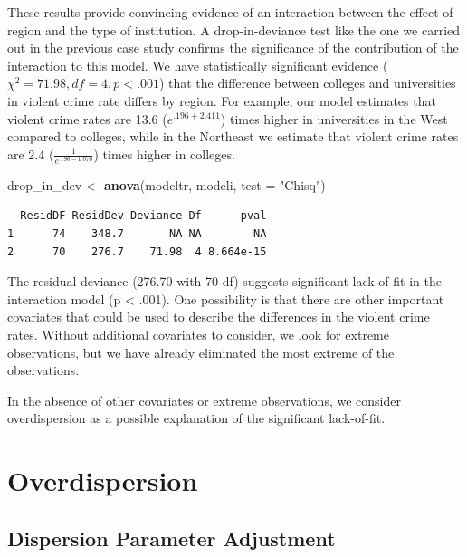 \documentclass[
]{krantz}
\newenvironment{Shaded}{\begin{snugshade}}{\end{snugshade}}
\newcommand{\AttributeTok}[1]{\textcolor[rgb]{0.27,0.27,0.27}{#1}}
\newcommand{\FunctionTok}[1]{\textcolor[rgb]{0.27,0.27,0.27}{\textbf{#1}}}
\newcommand{\NormalTok}[1]{#1}
\newcommand{\OtherTok}[1]{\textcolor[rgb]{0.37,0.37,0.37}{#1}}
\newcommand{\StringTok}[1]{\textcolor[rgb]{0.5,0.5,0.5}{#1}}
\begin{document}
These results provide convincing evidence of an interaction between the effect of region and the type of institution. A drop-in-deviance test like the one we carried out in the previous case study confirms the significance of the contribution of the interaction to this model. We have statistically significant evidence (\(\chi^2=71.98, df=4, p<.001\)) that the difference between colleges and universities in violent crime rate differs by region. For example, our model estimates that violent crime rates are 13.6 (\(e^{.196+2.411}\)) times higher in universities in the West compared to colleges, while in the Northeast we estimate that violent crime rates are 2.4 (\(\frac{1}{e^{.196-1.070}}\)) times higher in colleges.

\begin{Shaded}
\begin{Highlighting}[]
\NormalTok{drop\_in\_dev }\OtherTok{\textless{}{-}} \FunctionTok{anova}\NormalTok{(modeltr, modeli, }\AttributeTok{test =} \StringTok{"Chisq"}\NormalTok{)}
\end{Highlighting}
\end{Shaded}

\begin{verbatim}
  ResidDF ResidDev Deviance Df      pval
1      74    348.7       NA NA        NA
2      70    276.7    71.98  4 8.664e-15
\end{verbatim}

The residual deviance (276.70 with 70 df) suggests significant lack-of-fit in the interaction model (p \textless{} .001). One possibility is that there are other important covariates that could be used to describe the differences in the violent crime rates. Without additional covariates to consider, we look for extreme observations, but we have already eliminated the most extreme of the observations.

In the absence of other covariates or extreme observations, we consider overdispersion as a possible explanation of the significant lack-of-fit.

\section{Overdispersion}\label{sec-overdispPois}

\subsection{Dispersion Parameter Adjustment}\label{dispersion-parameter-adjustment}
\end{document}
